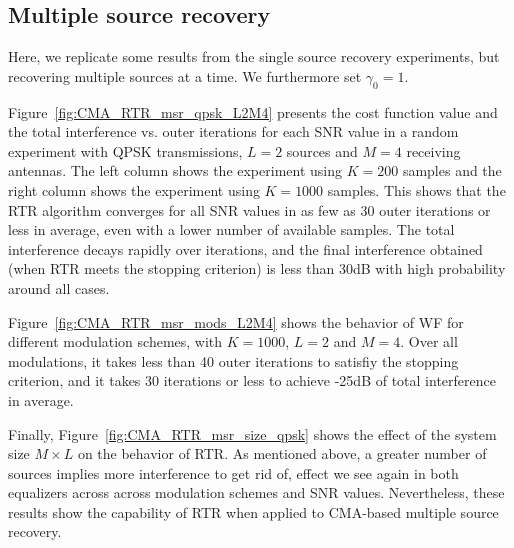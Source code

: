 \newpage
\subsection{Multiple source recovery}\label{sim:RTR_MSR}
Here, we replicate some results from the single source recovery experiments, but recovering multiple sources at a time. We furthermore set $\gamma_0=1$.

Figure~\ref{fig:CMA_RTR_msr_qpsk_L2M4} presents the cost function value and the total interference vs. outer iterations for each SNR value in a random experiment with QPSK transmissions, $L=2$ sources and $M=4$ receiving antennas. The left column shows the experiment using $K=200$ samples and the right column shows the experiment using $K=1000$ samples. This shows that the RTR algorithm converges for all SNR values in as few as 30 outer iterations or less in average, even with a lower number of available samples. The total interference decays rapidly over iterations, and the final interference obtained (when RTR meets the stopping criterion) is less than 30dB with high probability around all cases.

Figure~\ref{fig:CMA_RTR_msr_mods_L2M4} shows the behavior of WF for different modulation schemes, with $K=1000$, $L=2$ and $M=4$. Over all modulations, it takes less than 40 outer iterations to satisfiy the stopping criterion, and it takes 30 iterations or less to achieve -25dB of total interference in average.

Finally, Figure~\ref{fig:CMA_RTR_msr_size_qpsk} shows the effect of the system size $M\times L$ on the behavior of RTR. As mentioned above, a greater number of sources implies more interference to get rid of, effect we see again in both equalizers across across modulation schemes and SNR values. Nevertheless, these results show the capability of RTR when applied to CMA-based multiple source recovery.

